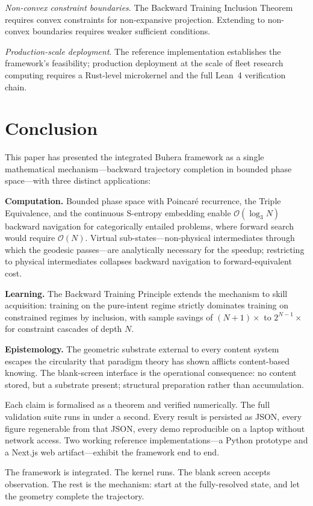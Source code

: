 \documentclass[twocolumn,11pt,a4paper]{article}
\begin{document}
\emph{Non-convex constraint boundaries}. The Backward Training Inclusion Theorem requires convex constraints for non-expansive projection. Extending to non-convex boundaries requires weaker sufficient conditions.

\emph{Production-scale deployment}. The reference implementation establishes the framework's feasibility; production deployment at the scale of fleet research computing requires a Rust-level microkernel and the full Lean~4 verification chain.


\section{Conclusion}
\label{sec:conclusion}

This paper has presented the integrated Buhera framework as a single mathematical mechanism---backward trajectory completion in bounded phase space---with three distinct applications:

\textbf{Computation.} Bounded phase space with Poincar\'e recurrence, the Triple Equivalence, and the continuous S-entropy embedding enable $\mathcal{O}(\log_3 N)$ backward navigation for categorically entailed problems, where forward search would require $\mathcal{O}(N)$. Virtual sub-states---non-physical intermediates through which the geodesic passes---are analytically necessary for the speedup; restricting to physical intermediates collapses backward navigation to forward-equivalent cost.

\textbf{Learning.} The Backward Training Principle extends the mechanism to skill acquisition: training on the pure-intent regime strictly dominates training on constrained regimes by inclusion, with sample savings of $(N+1)\times$ to $2^{N-1}\times$ for constraint cascades of depth $N$.

\textbf{Epistemology.} The geometric substrate external to every content system escapes the circularity that paradigm theory has shown afflicts content-based knowing. The blank-screen interface is the operational consequence: no content stored, but a substrate present; structural preparation rather than accumulation.

Each claim is formalised as a theorem and verified numerically. The full validation suite runs in under a second. Every result is persisted as JSON, every figure regenerable from that JSON, every demo reproducible on a laptop without network access. Two working reference implementations---a Python prototype and a Next.js web artifact---exhibit the framework end to end.

The framework is integrated. The kernel runs. The blank screen accepts observation. The rest is the mechanism: start at the fully-resolved state, and let the geometry complete the trajectory.




\end{document}
